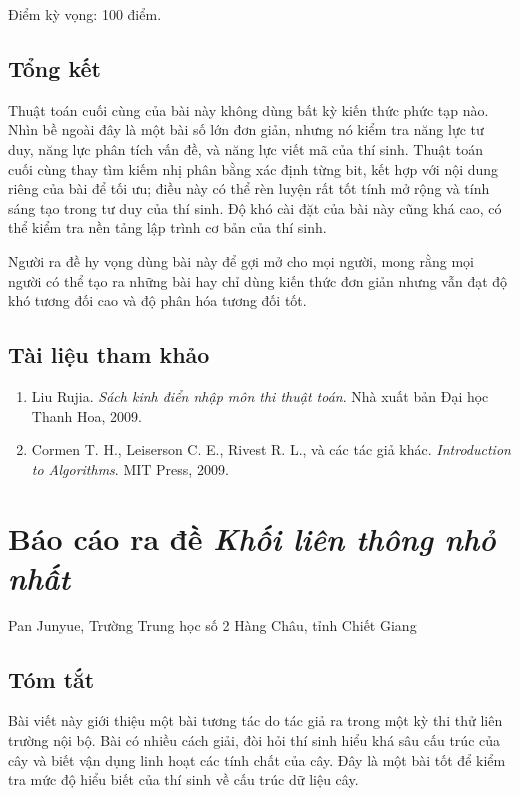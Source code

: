 \documentclass[11pt]{article}
\begin{document}
Điểm kỳ vọng: 100 điểm.

\subsection{Tổng kết}

Thuật toán cuối cùng của bài này không dùng bất kỳ kiến thức phức tạp nào.
Nhìn bề ngoài đây là một bài số lớn đơn giản, nhưng nó kiểm tra năng lực tư duy,
năng lực phân tích vấn đề, và năng lực viết mã của thí sinh. Thuật toán cuối
cùng thay tìm kiếm nhị phân bằng xác định từng bit, kết hợp với nội dung riêng
của bài để tối ưu; điều này có thể rèn luyện rất tốt tính mở rộng và tính sáng
tạo trong tư duy của thí sinh. Độ khó cài đặt của bài này cũng khá cao, có thể
kiểm tra nền tảng lập trình cơ bản của thí sinh.

Người ra đề hy vọng dùng bài này để gợi mở cho mọi người, mong rằng mọi người
có thể tạo ra những bài hay chỉ dùng kiến thức đơn giản nhưng vẫn đạt độ khó
tương đối cao và độ phân hóa tương đối tốt.

\subsection*{Tài liệu tham khảo}

\begin{enumerate}
  \item Liu Rujia. \emph{Sách kinh điển nhập môn thi thuật toán}. Nhà xuất bản
  Đại học Thanh Hoa, 2009.
  \item Cormen T. H., Leiserson C. E., Rivest R. L., và các tác giả khác.
  \emph{Introduction to Algorithms}. MIT Press, 2009.
\end{enumerate}

\section{Báo cáo ra đề \emph{Khối liên thông nhỏ nhất}}

\begin{center}
Pan Junyue, Trường Trung học số 2 Hàng Châu, tỉnh Chiết Giang
\end{center}

\subsection*{Tóm tắt}

Bài viết này giới thiệu một bài tương tác do tác giả ra trong một kỳ thi thử
liên trường nội bộ. Bài có nhiều cách giải, đòi hỏi thí sinh hiểu khá sâu cấu
trúc của cây và biết vận dụng linh hoạt các tính chất của cây. Đây là một bài
tốt để kiểm tra mức độ hiểu biết của thí sinh về cấu trúc dữ liệu cây.
\end{document}
